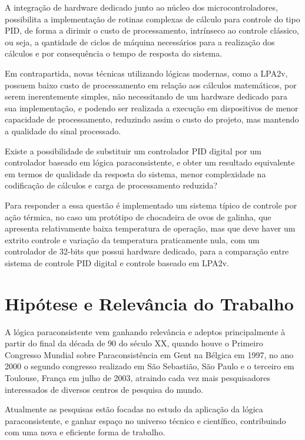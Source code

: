 A integração de hardware dedicado junto ao núcleo dos microcontroladores, possibilita a implementação de rotinas complexas de cálculo para controle do tipo PID, de forma a dirimir o custo de processamento, intrínseco ao controle clássico, ou seja, a qantidade de ciclos de máquina necessários para a realização dos cálculos e por consequência o tempo de resposta do sistema. 

Em contrapartida, novas técnicas utilizando lógicas modernas, como a LPA2v, possuem baixo custo de processamento em relação aos cálculos matemáticos, por serem inerentemente simples, não necessitando de um hardware dedicado para sua implementação, e podendo ser realizada a execução em dispositivos de menor capacidade de processamento, reduzindo assim o custo do projeto, mas mantendo a qualidade do sinal processado.

Existe a possibilidade de substituir um controlador PID digital por um controlador baseado em lógica paraconsistente, e obter um resultado equivalente em termos de qualidade da resposta do sistema, menor complexidade na codificação de cálculos e carga de processamento reduzida? 

Para responder a essa questão é implementado um sistema típico de controle por ação térmica, no caso um protótipo de chocadeira de ovos de galinha, que apresenta relativamente baixa temperatura de operação, mas que deve haver um extrito controle e variação da temperatura praticamente nula, com um controlador de 32-bits que possui hardware dedicado, para a comparação entre sistema de controle PID digital e controle baseado em LPA2v.



\section{Hipótese e Relevância do Trabalho}
A lógica paraconsistente vem ganhando relevância e adeptos principalmente à partir do final da década de 90 do século XX, quando houve o Primeiro Congresso Mundial sobre Paraconsistência em Gent na Bélgica em 1997, no ano 2000 o segundo congresso realizado em São Sebastião, São Paulo e o terceiro em Toulouse, França em julho de 2003, atraindo cada vez mais pesquisadores interessados de diversos centros de pesquisa do mundo.  \cite{DecioKrause}

Atualmente as pesquisas estão focadas no estudo da aplicação da lógica paraconsistente, e ganhar espaço no universo técnico e científico, contribuindo com uma nova e eficiente forma de trabalho.

